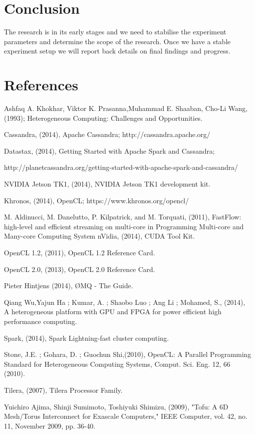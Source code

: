 \documentclass{acm_proc_article-sp}
\begin{document}
\section{Conclusion}
The research is in its early stages and we need to stabilise the experiment parameters and determine the scope of the research. Once we have a stable experiment setup we will report back details on final findings and progress.
\section{References}
\begin{small}
Ashfaq A. Khokhar, Viktor K. Prasanna,Muhammad E. Shaaban, Cho-Li Wang, (1993); Heterogeneous Computing: Challenges and Opportunities.

Cassandra, (2014), Apache Cassandra; http://cassandra.apache.org/ 

Datastax, (2014), Getting Started with Apache Spark and Cassandra; 

http://planetcassandra.org/getting-started-with-apache-spark-and-cassandra/ 

NVIDIA Jetson TK1, (2014), NVIDIA Jetson TK1 development kit.

Khronos, (2014), OpenCL; https://www.khronos.org/opencl/

M. Aldinucci, M. Danelutto, P. Kilpatrick, and M. Torquati, (2011), 
FastFlow: high-level and efficient streaming on multi-core in Programming Multi-core and Many-core Computing System
nVidia, (2014), CUDA Tool Kit.

OpenCL 1.2, (2011), OpenCL 1.2 Reference Card.

OpenCL 2.0, (2013), OpenCL 2.0 Reference Card.

Pieter Hintjens (2014), ØMQ - The Guide.

Qiang Wu,Yajun Ha ; Kumar, A. ; Shaobo Luo ; Ang Li ; Mohamed, S., (2014), A heterogeneous platform with GPU and FPGA for power efficient high performance computing.

Spark, (2014), Spark Lightning-fast cluster computing.

Stone, J.E. ; Gohara, D. ; Guochun Shi,(2010), OpenCL: A Parallel Programming Standard for Heterogeneous Computing Systems, Comput. Sci. Eng. 12, 66 (2010).

Tilera, (2007), Tilera Processor Family.

Yuichiro Ajima, Shinji Sumimoto, Toshiyuki Shimizu, (2009), "Tofu: A 6D Mesh/Torus Interconnect for Exascale Computers," IEEE Computer, vol. 42, no. 11, November 2009, pp. 36-40.
\end{small}
\end{document}
